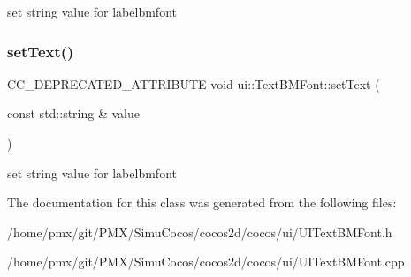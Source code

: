 set string value for labelbmfont \mbox{\label{classui_1_1TextBMFont_a7709799981f60b2586798726a674946f}} 
\subsubsection{\texorpdfstring{set\+Text()}{setText()}\hspace{0.1cm}{\footnotesize\ttfamily [2/2]}}
{\footnotesize\ttfamily C\+C\+\_\+\+D\+E\+P\+R\+E\+C\+A\+T\+E\+D\+\_\+\+A\+T\+T\+R\+I\+B\+U\+TE void ui\+::\+Text\+B\+M\+Font\+::set\+Text (\begin{DoxyParamCaption}\item[{const std\+::string \&}]{value }\end{DoxyParamCaption})\hspace{0.3cm}{\ttfamily [inline]}}

set string value for labelbmfont 

The documentation for this class was generated from the following files\+:\begin{DoxyCompactItemize}
\item 
/home/pmx/git/\+P\+M\+X/\+Simu\+Cocos/cocos2d/cocos/ui/U\+I\+Text\+B\+M\+Font.\+h\item 
/home/pmx/git/\+P\+M\+X/\+Simu\+Cocos/cocos2d/cocos/ui/U\+I\+Text\+B\+M\+Font.\+cpp\end{DoxyCompactItemize}
